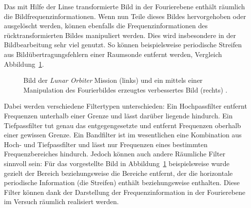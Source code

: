 
Das mit Hilfe der Linse transformierte Bild in der Fourierebene enthält räumlich die Bildfrequenzinformationen. Wenn nun Teile dieses Bildes hervorgehoben oder ausgelöscht werden, können ebenfalls die Frequenzinformationen des rücktransformierten Bildes manipuliert werden. Dies wird insbesondere in der Bildbearbeitung sehr viel genutzt. So können beispielsweise periodische Streifen aus Bildübertragungsfehlern einer Raumsonde entfernt werden, Vergleich Abbildung~\ref{fig:Plato_LO_big}.

\begin{figure}[h]
	\centering
	\caption[Beispiel der FT in der Bildbearbeitung]{Bild der \textit{Lunar Orbiter} Mission (links) und ein mittels einer Manipulation des Fourierbildes erzeugtes verbessertes Bild (rechts) \cite{_highlight_????}.}
	\label{fig:Plato_LO_big}
\end{figure}

Dabei werden verschiedene Filtertypen unterschieden: Ein Hochpassfilter entfernt Frequenzen unterhalb einer Grenze und lässt darüber liegende hindurch. Ein Tiefpassfilter tut genau das entgegengesetzte und entfernt Frequenzen oberhalb einer gewissen Grenze. Ein Bandfilter ist im wesentlichen eine Kombination aus Hoch- und Tiefpassfilter und lässt nur Frequenzen eines bestimmten Frequenzbereiches hindurch. Jedoch können auch andere Räumliche Filter sinnvoll sein: Für das vorgestellte Bild in Abbildung~\ref{fig:Plato_LO_big} beispielsweise wurde gezielt der Bereich beziehungsweise die Bereiche entfernt, der die horizontale periodische Information (die Streifen) enthält beziehungsweise enthalten. Diese Filter können dank der Darstellung der Frequenzinformation in der Fourierebene im Versuch räumlich realisiert werden.
